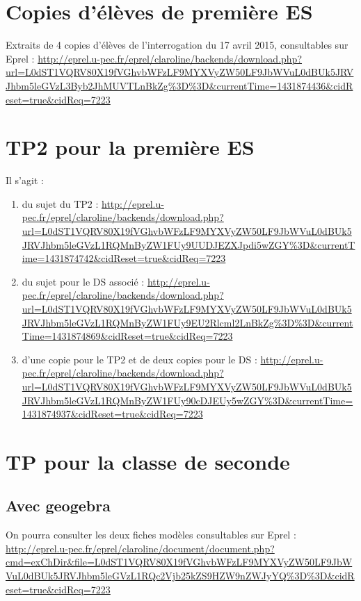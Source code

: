 \chapter{Copies d'élèves de première ES}

Extraits de 4 copies d'élèves de l'interrogation du 17 avril 2015, consultables sur Eprel :
\url{http://eprel.u-pec.fr/eprel/claroline/backends/download.php?url=L0dST1VQRV80X19fVGhvbWFzLF9MYXVyZW50LF9JbWVuL0dBUk5JRVJhbm5leGVzL3Byb2JhMUVTLnBkZg\%3D\%3D\&currentTime=1431874436\&cidReset=true\&cidReq=7223}

\chapter{TP2 pour la première ES}

Il s'agit :
\begin{enumerate}
\item du sujet du TP2 : \url{http://eprel.u-pec.fr/eprel/claroline/backends/download.php?url=L0dST1VQRV80X19fVGhvbWFzLF9MYXVyZW50LF9JbWVuL0dBUk5JRVJhbm5leGVzL1RQMnByZW1FUy9UUDJEZXJpdi5wZGY\%3D\&currentTime=1431874742\&cidReset=true\&cidReq=7223}
\item du sujet pour le DS associé : \url{http://eprel.u-pec.fr/eprel/claroline/backends/download.php?url=L0dST1VQRV80X19fVGhvbWFzLF9MYXVyZW50LF9JbWVuL0dBUk5JRVJhbm5leGVzL1RQMnByZW1FUy9EU2Rlcml2LnBkZg\%3D\%3D\&currentTime=1431874869\&cidReset=true\&cidReq=7223}
\item d'une copie pour le TP2 et de deux copies pour le DS : \url{http://eprel.u-pec.fr/eprel/claroline/backends/download.php?url=L0dST1VQRV80X19fVGhvbWFzLF9MYXVyZW50LF9JbWVuL0dBUk5JRVJhbm5leGVzL1RQMnByZW1FUy90cDJEUy5wZGY\%3D\&currentTime=1431874937\&cidReset=true\&cidReq=7223}
\end{enumerate}

\chapter{TP pour la classe de seconde}

\section{Avec geogebra}

On pourra consulter les deux fiches modèles consultables sur Eprel : \url{http://eprel.u-pec.fr/eprel/claroline/document/document.php?cmd=exChDir&file=L0dST1VQRV80X19fVGhvbWFzLF9MYXVyZW50LF9JbWVuL0dBUk5JRVJhbm5leGVzL1RQc2Vjb25kZS9HZW9nZWJyYQ\%3D\%3D\&cidReset=true\&cidReq=7223}

